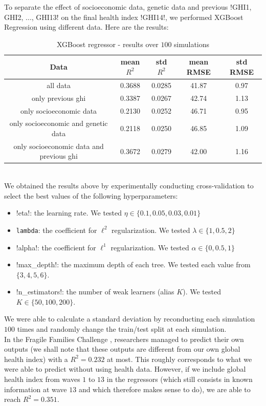 \documentclass[]{article}
\begin{document}
\noindent
To separate the effect of socioeconomic data, genetic data and previous \pyth!GHI1, GHI2, ..., GHI13! on the final health index \pyth!GHI14!, we performed XGBoost Regression using different data. Here are the results:
\begin{table}[!h]
\centering
\begin{tabular}{|c|c|c|c|c|}
	\hline
	\textbf{Data} & \textbf{mean $R^2$} & \textbf{std $R^2$} & \textbf{mean RMSE} & \textbf{std RMSE}\\
	\hline
	all data & 0.3688 & 0.0285 & 41.87 & 0.97 \\ 
	\hline
	only previous ghi & 0.3387 & 0.0267 & 42.74 & 1.13\\
	\hline 
	only socioeconomic data & 0.2130 &0.0252 & 46.71 & 0.95\\
	\hline 
	only socioeconomic and genetic data & 0.2118 & 0.0250 & 46.85 & 1.09\\
	\hline 
	only socioeconomic data and previous ghi & 0.3672 &	0.0279 & 42.00 & 1.16\\
	\hline 
\end{tabular}
\caption{XGBoost regressor - results over $100$ simulations}
\label{results_xgbregressor}
\end{table}\\
We obtained the results above by experimentally conducting cross-validation to select the best values of the following hyperparameters:
\begin{itemize}
	\item \pyth!eta!: the learning rate. We tested $\eta \in \{0.1, 0.05, 0.03, 0.01\}$
	\item \texttt{lambda}: the coefficient for $\ell^2$ regularization. We tested $\lambda \in \{1, 0.5, 2\}$
	\item \pyth!alpha!: the coefficient for $\ell^1$ regularization. We tested $\alpha \in \{0, 0.5, 1\}$
	\item \pyth!max_depth!: the maximum depth of each tree. We tested each value from $\{3, 4, 5, 6\}$.
	\item \pyth!n_estimators!: the number of weak learners (alias $K$). We tested $K\in \{50, 100, 200\}$.
\end{itemize}
We were able to calculate a standard deviation by reconducting each simulation $100$ times and randomly change the train/test split at each simulation.\\

\noindent
In the Fragile Families Challenge \cite{challenge2017}, researchers managed to predict their own outputs (we shall note that these outputs are different from our own global health index) with a $R^2 = 0.232$ at most. This roughly corresponds to what we were able to predict without using health data. However, if we include global health index from waves $1$ to $13$ in the regressors (which still consists in known information at wave $13$ and which therefore makes sense to do), we are able to reach $R^2=0.351$.\\
\end{document}

